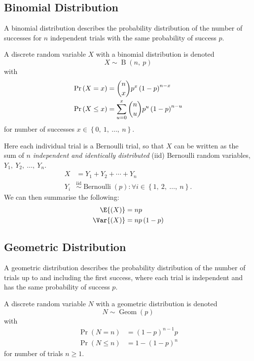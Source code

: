 \documentclass{article}
\begin{document}
\begin{multicols}{3}
    \subsection{Binomial Distribution}
    A binomial distribution describes the probability distribution of the number of successes
    for \(n\) independent trials with the same probability of success \(p\).

    A discrete random variable \(X\) with a binomial distribution is denoted
    \begin{equation*}
        X \sim \operatorname{B}{\left( n,\: p \right)}
    \end{equation*}
    with
    \begin{align*}
        \Pr{\left( X = x \right)}    & = \dbinom{n}{x} p^x \left( 1 - p \right)^{n - x}                \\
        \Pr{\left( X \leq x \right)} & = \sum_{u = 0}^x \dbinom{n}{u} p^u \left( 1 - p \right)^{n - u}
    \end{align*}
    for number of successes \(x \in \left\{ 0,\: 1,\: \dots,\: n \right\}\).

    Here each individual trial is a Bernoulli trial, so that \(X\) can be written as the sum of
    \(n\) \textit{independent and identically distributed} (iid) Bernoulli random variables, \(Y_1,\: Y_2,\: \dots,\: Y_n\).
    \begin{align*}
        X & = Y_1 + Y_2 + \cdots + Y_n \\
        Y_i & \overset{\mathrm{iid}}{\sim} \operatorname{Bernoulli}{\left( p \right)} : \forall i \in \left\{ 1,\: 2,\: \dots,\: n \right\}.
    \end{align*}
    We can then summarise the following:
    \begin{align*}
        \E{\left( X \right)}   & = np                      \\
        \Var{\left( X \right)} & = np \left( 1 - p \right)
    \end{align*}
    \subsection{Geometric Distribution}
    A geometric distribution describes the probability distribution of the number of trials up to and including
    the first success, where each trial is independent and has the same probability of success \(p\).

    A discrete random variable \(N\) with a geometric distribution is denoted
    \begin{equation*}
        N \sim \operatorname{Geom}{\left( p \right)}
    \end{equation*}
    with
    \begin{align*}
        \Pr{\left( N = n \right)}    & = \left( 1 - p \right)^{n - 1} p \\
        \Pr{\left( N \leq n \right)} & = 1 - \left( 1 - p \right)^n
    \end{align*}
    for number of trials \(n \geq 1\).


\end{multicols}
\end{document}
